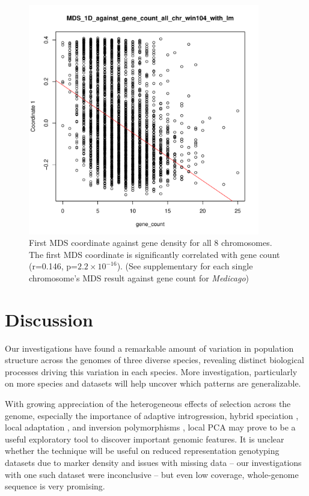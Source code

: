 \documentclass[11pt, oneside]{article}   	%
\begin{document}
\begin{figure}
    \begin{center}
       \includegraphics[width=0.9\textwidth]{Fig6_MDS_1D_against_gene_count_all_chr_win104_with_lm}
    \end{center}
    \caption{
        First MDS coordinate against gene density for all 8 chromosomes. 
        The first MDS coordinate is significantly correlated with gene count (r=0.146, p=$2.2\times 10^{-16}$). 
        (See supplementary for each single chromosome's MDS result against gene count for \textit{Medicago})
        \label{fig:mds_gene_count}
    }
\end{figure}

\section{Discussion}

Our investigations have found a remarkable amount of variation in population structure across the genomes
of three diverse species,
revealing distinct biological processes driving this variation in each species.
More investigation, particularly on more species and datasets will help uncover which patterns are generalizable.

With growing appreciation of the heterogeneous effects of selection across the genome,
especially the importance of adaptive introgression, hybrid speciation \citep{pool2015natural,brandvain2014speciation,hufford2013genomic,fitzpatrick2010rapid,staubach2012genome},
local adaptation \citep{lenormand2002limits,wang2014isolation},
and inversion polymorphisms \citep{kirkpatrick2015chromosome,kirkpatrick2010chromosome},
local PCA may prove to be a useful exploratory tool to discover important genomic features.
It is unclear whether the technique will be useful on reduced representation genotyping datasets 
due to marker density and issues with missing data --
our investigations with one such dataset were inconclusive --
but even low coverage, whole-genome sequence is very promising.
\end{document}
